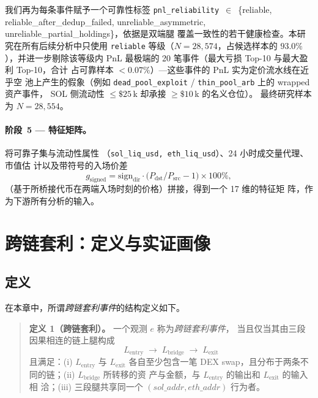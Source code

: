 \documentclass[sigconf,nonacm,10pt]{acmart}
\newcommand{\gsigned}{g_{\text{signed}}}
\begin{document}
我们再为每条事件赋予一个可靠性标签
\texttt{pnl\_reliability}~$\in$~\{reliable, \allowbreak reliable\allowbreak\_after\allowbreak\_dedup\allowbreak\_failed, \allowbreak unreliable\allowbreak\_asymmetric, \allowbreak unreliable\allowbreak\_partial\allowbreak\_holdings\}，依据是双端腿
覆盖一致性的若干健康检查。本研究在所有后续分析中只使用 \texttt{reliable}
等级（$N=28{,}574$，占候选样本的 $93.0\%$），并进一步剔除该等级内
PnL 最极端的 20 笔事件（最大亏损 Top-10 与最大盈利 Top-10，合计
占可靠样本 $<\!0.07\%$）---这些事件的 PnL 实为定价流水线在近乎空
池上产生的假象（例如
\texttt{dead\allowbreak\_pool\allowbreak\_exploit} /
\texttt{thin\allowbreak\_pool\allowbreak\_arb} 上的 wrapped 资产事件，
SOL 侧流动性 $\leq\!\$25$\,k 却承接 $\geq\!\$10$\,k 的名义仓位）。
最终研究样本为 $N = 28{,}554$。

\paragraph{阶段~5 --- 特征矩阵。} 将可靠子集与流动性属性
（\texttt{sol\_liq\_usd, eth\_liq\_usd}）、24 小时成交量代理、市值估
计以及带符号的入场价差
\begin{equation}
\label{eq:ch4-gsigned}
    \gsigned = \mathrm{sign}_{\text{dir}}\!\cdot\!
    \bigl(P_{\text{dst}}/P_{\text{src}}-1\bigr)\!\times\!100\%,
\end{equation}
（基于所桥接代币在两端入场时刻的价格）拼接，得到一个 17 维的特征矩
阵，作为下游所有分析的输入。

\section{跨链套利：定义与实证画像}
\label{sec:ch4-arbitrage}

\subsection{定义}

在本章中，所谓\emph{跨链套利事件}的结构定义如下。

\begin{quote}
\textbf{定义 1（跨链套利）。} 一个观测 $e$ 称为\textit{跨链套利事件}，
当且仅当其由三段因果相连的链上腿构成
\[
    L_{\text{entry}} \;\to\; L_{\text{bridge}} \;\to\; L_{\text{exit}}
\]
且满足：(i) $L_{\text{entry}}$ 与 $L_{\text{exit}}$ 各自至少包含一笔
DEX swap，且分布于两条不同的链；(ii) $L_{\text{bridge}}$ 所转移的资
产与金额，与 $L_{\text{entry}}$ 的输出和 $L_{\text{exit}}$ 的输入相
洽；(iii) 三段腿共享同一个 $(sol\_addr, eth\_addr)$ 行为者。
\end{quote}
\end{document}
